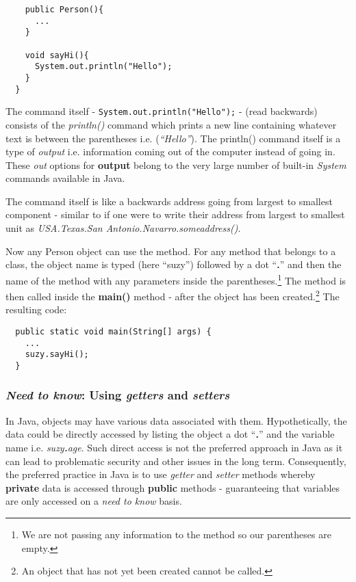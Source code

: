 \documentclass{article}
\begin{document}
\begin{flushleft}
\begin{verbatim}
    public Person(){
      ...
    }
     
    void sayHi(){
      System.out.println("Hello");
    }
  }
\end{verbatim}

The command itself - \texttt{System.out.println("Hello");} - (read backwards) consists of the \emph{println()} command which prints a new line containing whatever text is between the parentheses i.e. (\emph{``Hello''}). The println() command itself is a type of \emph{output} i.e. information coming out of the computer instead of going in. These \emph{out} options for \textbf{output} belong to the very large number of built-in \emph{System} commands available in Java.\par
The command itself is like a backwards address going from largest to smallest component - similar to if one were to write their address from largest to smallest unit as \emph{USA.Texas.San Antonio.Navarro.someaddress()}.\par
Now any Person object can use the method. For any method that belongs to a class, the object name is typed (here ``suzy'') followed by a dot ``\textbf{.}'' and then the name of the method with any parameters inside the parentheses.\footnote{We are not passing any information to the method so our parentheses are empty.} The method is then called inside the \textbf{main()} method - after the object has been created.\footnote{An object that has not yet been created cannot be called.} The resulting code:
\begin{verbatim}
  public static void main(String[] args) {
    ...
    suzy.sayHi();
  }
\end{verbatim}


\subsubsection{\textit{Need to know}: Using \emph{getters} and \emph{setters}
}
In Java, objects may have various data associated with them. Hypothetically, the data could be directly accessed by listing the object a dot ``\textbf{.}'' and the variable name i.e. \emph{suzy\textbf{.}age}. Such direct access is not the preferred approach in Java as it can lead to problematic security and other issues in the long term. Consequently, the preferred practice in Java is to use \emph{getter} and \emph{setter} methods whereby \textbf{private} data is accessed through \textbf{public} methods - guaranteeing that variables are only accessed on a \emph{need to know} basis.\par

\end{flushleft}
\end{document}

